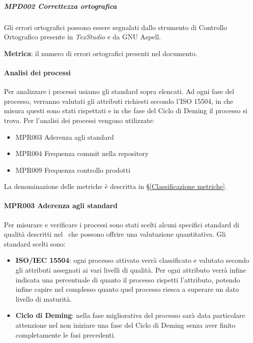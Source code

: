 			\subparagraph{MPD002 Correttezza ortografica}\label{AnalisiStatica:CorrettezzaOrtografica}
			Gli errori ortografici possono essere segnalati dallo strumento di Controllo Ortografico presente in \textit{TexStudio} e da GNU Aspell.

			\textbf{Metrica}: il numero di errori ortografici presenti nel documento.


			\paragraph{Analisi dei processi}
			Per analizzare i processi usiamo gli standard sopra elencati. Ad ogni fase del processo, verranno valutati gli attributi richiesti secondo
			l'ISO 15504, in che misura questi sono stati rispettati e in che fase del Ciclo di Deming il processo si trova.
			Per l'analisi dei processi vengono utilizzate:

			\begin{itemize}
                \item MPR003 Aderenza agli standard
				\item MPR004 Frequenza commit nella repository
				\item MPR009 Frequenza controllo prodotti
			\end{itemize}

			La denominazione delle metriche è descritta in \S\ref{Classificazione metriche}.
            
            \paragraph{MPR003 Aderenza agli standard}
            Per misurare e verificare i processi sono stati scelti alcuni specifici standard di qualità descritti nel \PdQ\ che possono offrire una valutazione quantitativa.
            Gli standard scelti sono:
            
            \begin{itemize}
                \item \textbf{ISO/IEC 15504}: ogni processo attivato verrà classificato e valutato secondo gli attributi assegnati ai vari livelli di qualità. Per ogni attributo verrà infine indicata una percentuale di quanto il processo rispetti l'attributo, potendo infine capire nel complesso quanto quel processo riesca a superare un dato livello di maturità.
                \item \textbf{Ciclo di Deming}: nella fase migliorativa del processo sarà data particolare attenzione nel non iniziare una fase del Ciclo di Deming senza aver finito completamente le fasi precedenti.
            \end{itemize}
            
